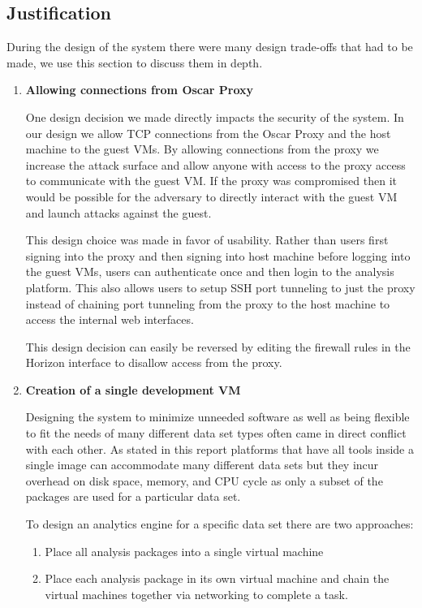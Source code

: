\subsection{Justification}
\label{sec:justification}

During the design of the system there were many design trade-offs that
had to be made, we use this section to discuss them in depth.

\begin{enumerate}
  \item \textbf{Allowing connections from Oscar Proxy}

    One design decision we made directly impacts the security of the
    system. In our design we allow TCP connections from the Oscar Proxy
    and the host machine to the guest VMs. By allowing connections from
    the proxy we increase the attack surface and allow anyone with
    access to the proxy access to communicate with the guest VM. If
    the proxy was compromised then it would be possible for the
    adversary to directly interact with the guest VM and launch attacks 
    against the guest.

    This design choice was made in favor of usability. Rather than users
    first signing into the proxy and then signing into host machine
    before logging into the guest VMs, users can authenticate once and
    then login to the analysis platform. This also allows users to setup
    SSH port tunneling to just the proxy instead of chaining port
    tunneling from the proxy to the host machine to access the internal 
    web interfaces.

    This design decision can easily be reversed by editing the firewall
    rules in the Horizon interface to disallow access from the proxy.

  \item \textbf{Creation of a single development VM}

    Designing the system to minimize unneeded software as well as being 
    flexible to fit the needs of many different data set types often
    came in direct conflict with each other. As stated in this report
    platforms that have all tools inside a single image can accommodate 
    many different data sets but they incur overhead on disk space,
    memory, and CPU cycle as only a subset of the packages are used for
    a particular data set. 

    To design an analytics engine for a specific data set there are two
    approaches: 
    \begin{enumerate}[1.]
      \item Place all analysis packages into a single virtual machine
      \item Place each analysis package in its own virtual machine and
        chain the virtual machines together via networking to complete a
        task.
    \end{enumerate}
    

\end{enumerate}

